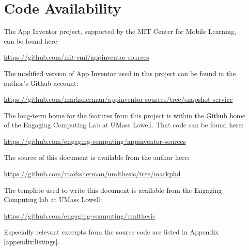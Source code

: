 \chapter{Code Availability}

\noindent The App Inventor project, supported by the MIT Center for Mobile Learning, can be found here:

\noindent \url{https://github.com/mit-cml/appinventor-sources}

\noindent The modified version of App Inventor used in this project can be found in the author's Github account:

\noindent \url{https://github.com/marksherman/appinventor-sources/tree/snapshot-service}

\noindent The long-term home for the features from this project is within the Github home of the Engaging Computing Lab at UMass Lowell. That code can be found here:

\noindent \url{https://github.com/engaging-computing/appinventor-sources}

\noindent The source of this document is available from the author here:

\noindent \url{https://github.com/marksherman/umlthesis/tree/markphd}

\noindent The template used to write this document is available from the Engaging Computing lab at UMass Lowell:

\noindent \url{https://github.com/engaging-computing/umlthesis}

\noindent Especially relevant excerpts from the source code are listed in Appendix \ref{appendix:listings}.


